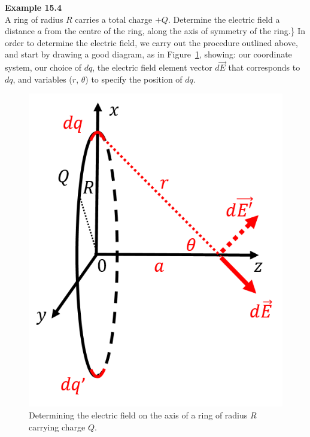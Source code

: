 \begin{framed}
\textbf{Example 15.4}\\
A ring of radius $R$ carries a total charge $+Q$. Determine the electric field a distance $a$ from the centre of the ring, along the axis of symmetry of the ring.\}
In order to determine the electric field, we carry out the procedure outlined above, and start by drawing a good diagram, as in Figure~\ref{fig:chargesfields:ring}, showing: our coordinate system, our choice of $dq$, the electric field element vector $d\vec E$ that corresponds to $dq$, and variables ($r$, $\theta$) to specify the position of $dq$.

\begin{figure}[!htbp]
\centering
\includegraphics[width=0.3\linewidth]{files/ring-03c4e5297f14b48cab0838925852ec16.png}
\caption[]{Determining the electric field on the axis of a ring of radius $R$ carrying charge $Q$.}
\label{fig:chargesfields:ring}
\end{figure}


\end{framed}
